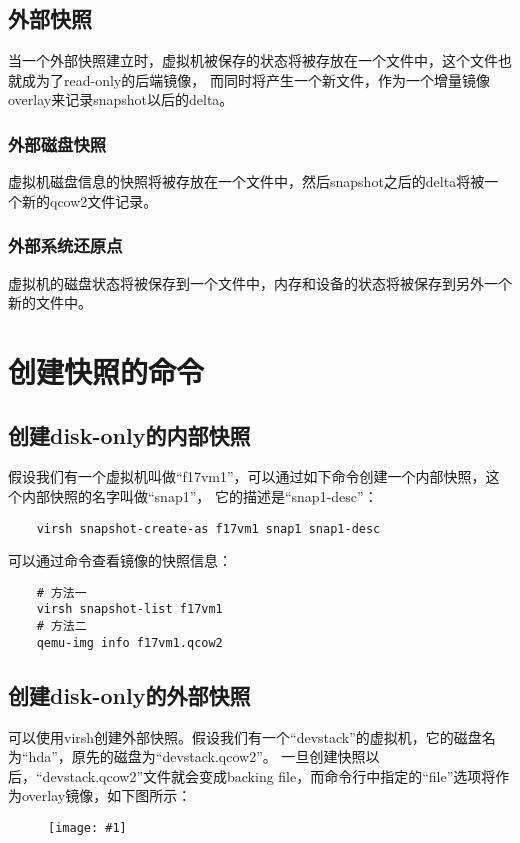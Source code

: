 \documentclass[a4paper,left=1.5cm,right=1.5cm,11pt]{article}
\newcommand{\fic}[1]{\begin{figure}[H]
		\center
		\texttt{[image: \#1]}
	\end{figure}}
\begin{document}
\subsection{外部快照}
    当一个外部快照建立时，虚拟机被保存的状态将被存放在一个文件中，这个文件也就成为了read-only的后端镜像，
    而同时将产生一个新文件，作为一个增量镜像overlay来记录snapshot以后的delta。

\subsubsection{外部磁盘快照}
    虚拟机磁盘信息的快照将被存放在一个文件中，然后snapshot之后的delta将被一个新的qcow2文件记录。\par

\subsubsection{外部系统还原点}
    虚拟机的磁盘状态将被保存到一个文件中，内存和设备的状态将被保存到另外一个新的文件中。

\clearpage

\section{创建快照的命令}
\subsection{创建disk-only的内部快照}
    假设我们有一个虚拟机叫做“f17vm1”，可以通过如下命令创建一个内部快照，这个内部快照的名字叫做“snap1”，
    它的描述是“snap1-desc”：
    \begin{lstlisting}
    virsh snapshot-create-as f17vm1 snap1 snap1-desc
    \end{lstlisting}

    可以通过命令查看镜像的快照信息：
    \begin{lstlisting}
    # 方法一
    virsh snapshot-list f17vm1
    # 方法二
    qemu-img info f17vm1.qcow2
    \end{lstlisting}

\subsection{创建disk-only的外部快照}
    可以使用virsh创建外部快照。假设我们有一个“devstack”的虚拟机，它的磁盘名为“hda”，原先的磁盘为“devstack.qcow2”。
    一旦创建快照以后，“devstack.qcow2”文件就会变成backing file，而命令行中指定的“file”选项将作为overlay镜像，如下图所示：
    \fic{3.png}
\end{document}
